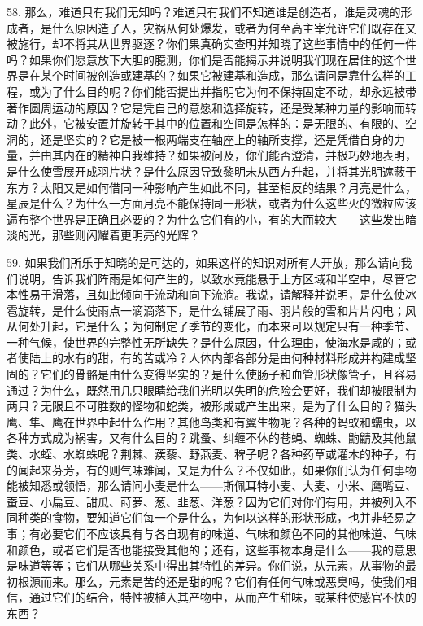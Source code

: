58. 那么，难道只有我们无知吗？难道只有我们不知道谁是创造者，谁是灵魂的形成者，是什么原因造了人，灾祸从何处爆发，或者为何至高主宰允许它们既存在又被施行，却不将其从世界驱逐？你们果真确实查明并知晓了这些事情中的任何一件吗？如果你们愿意放下大胆的臆测，你们是否能揭示并说明我们现在居住的这个世界是在某个时间被创造或建基的？如果它被建基和造成，那么请问是靠什么样的工程，或为了什么目的呢？你们能否提出并指明它为何不保持固定不动，却永远被带著作圆周运动的原因？它是凭自己的意愿和选择旋转，还是受某种力量的影响而转动？此外，它被安置并旋转于其中的位置和空间是怎样的：是无限的、有限的、空洞的，还是坚实的？它是被一根两端支在轴座上的轴所支撑，还是凭借自身的力量，并由其内在的精神自我维持？如果被问及，你们能否澄清，并极巧妙地表明，是什么使雪展开成羽片状？是什么原因导致黎明未从西方升起，并将其光明遮蔽于东方？太阳又是如何借同一种影响产生如此不同，甚至相反的结果？月亮是什么，星辰是什么？为什么一方面月亮不能保持同一形状，或者为什么这些火的微粒应该遍布整个世界是正确且必要的？为什么它们有的小，有的大而较大——这些发出暗淡的光，那些则闪耀着更明亮的光辉？\par

59. 如果我们所乐于知晓的是可达的，如果这样的知识对所有人开放，那么请向我们说明，告诉我们阵雨是如何产生的，以致水竟能悬于上方区域和半空中，尽管它本性易于滑落，且如此倾向于流动和向下流淌。我说，请解释并说明，是什么使冰雹旋转，是什么使雨点一滴滴落下，是什么铺展了雨、羽片般的雪和片片闪电；风从何处升起，它是什么；为何制定了季节的变化，而本来可以规定只有一种季节、一种气候，使世界的完整性无所缺失？是什么原因，什么理由，使海水是咸的；或者使陆上的水有的甜，有的苦或冷？人体内部各部分是由何种材料形成并构建成坚固的？它们的骨骼是由什么变得坚实的？是什么使肠子和血管形状像管子，且容易通过？为什么，既然用几只眼睛给我们光明以失明的危险会更好，我们却被限制为两只？无限且不可胜数的怪物和蛇类，被形成或产生出来，是为了什么目的？猫头鹰、隼、鹰在世界中起什么作用？其他鸟类和有翼生物呢？各种的蚂蚁和蠕虫，以各种方式成为祸害，又有什么目的？跳蚤、纠缠不休的苍蝇、蜘蛛、鼩鼱及其他鼠类、水蛭、水蜘蛛呢？荆棘、蒺藜、野燕麦、稗子呢？各种药草或灌木的种子，有的闻起来芬芳，有的则气味难闻，又是为什么？不仅如此，如果你们认为任何事物能被知悉或领悟，那么请问小麦是什么——斯佩耳特小麦、大麦、小米、鹰嘴豆、蚕豆、小扁豆、甜瓜、莳萝、葱、韭葱、洋葱？因为它们对你们有用，并被列入不同种类的食物，要知道它们每一个是什么，为何以这样的形状形成，也并非轻易之事；有必要它们不应该具有与各自现有的味道、气味和颜色不同的其他味道、气味和颜色，或者它们是否也能接受其他的；还有，这些事物本身是什么——我的意思是味道等等；它们从哪些关系中得出其特性的差异。你们说，从元素，从事物的最初根源而来。那么，元素是苦的还是甜的呢？它们有任何气味或恶臭吗，使我们相信，通过它们的结合，特性被植入其产物中，从而产生甜味，或某种使感官不快的东西？\par

